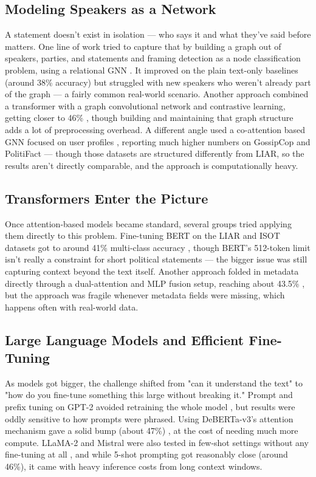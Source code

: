 \documentclass[a4paper,fleqn]{cas-sc}
\begin{document}
\subsection{Modeling Speakers as a Network}
A statement doesn't exist in isolation — who says it and what they've said before matters. One line of work tried to capture that by building a graph out of speakers, parties, and statements and framing detection as a node classification problem, using a relational GNN \citep{kirilin2019relational}. It improved on the plain text-only baselines (around 38\% accuracy) but struggled with new speakers who weren't already part of the graph — a fairly common real-world scenario. Another approach combined a transformer with a graph convolutional network and contrastive learning, getting closer to 46\% \citep{park2024graph}, though building and maintaining that graph structure adds a lot of preprocessing overhead. A different angle used a co-attention based GNN focused on user profiles \citep{khedairia2025co}, reporting much higher numbers on GossipCop and PolitiFact — though those datasets are structured differently from LIAR, so the results aren't directly comparable, and the approach is computationally heavy.

\subsection{Transformers Enter the Picture}
Once attention-based models became standard, several groups tried applying them directly to this problem. Fine-tuning BERT on the LIAR and ISOT datasets got to around 41\% multi-class accuracy \citep{khan2020fake}, though BERT's 512-token limit isn't really a constraint for short political statements — the bigger issue was still capturing context beyond the text itself. Another approach folded in metadata directly through a dual-attention and MLP fusion setup, reaching about 43.5\% \citep{yang2022multimodal}, but the approach was fragile whenever metadata fields were missing, which happens often with real-world data.

\subsection{Large Language Models and Efficient Fine-Tuning}
As models got bigger, the challenge shifted from "can it understand the text" to "how do you fine-tune something this large without breaking it." Prompt and prefix tuning on GPT-2 avoided retraining the whole model \citep{zhou2023fine}, but results were oddly sensitive to how prompts were phrased. Using DeBERTa-v3's attention mechanism gave a solid bump (about 47\%) \citep{martinez2024deberta}, at the cost of needing much more compute. LLaMA-2 and Mistral were also tested in few-shot settings without any fine-tuning at all \citep{kumar2024combating}, and while 5-shot prompting got reasonably close (around 46\%), it came with heavy inference costs from long context windows.
\end{document}
